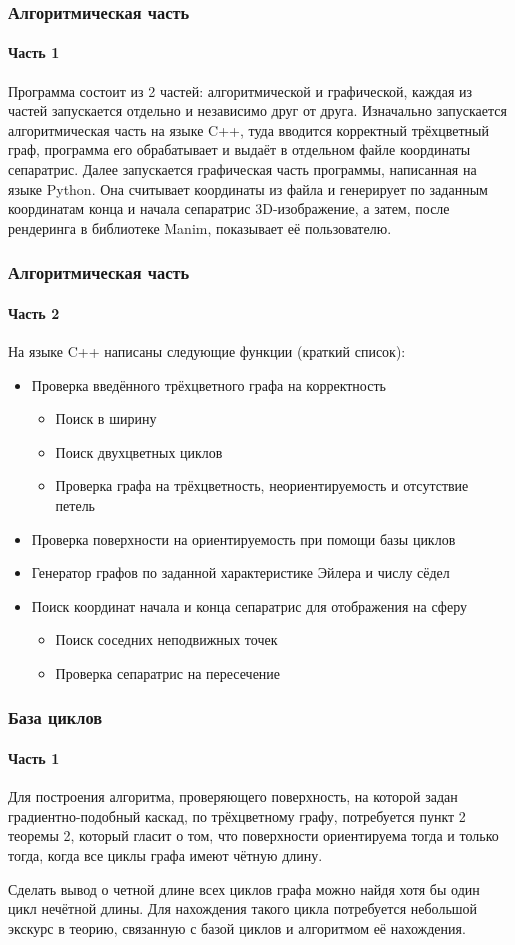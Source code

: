 \documentclass[aspectratio=169]{beamer}
\begin{document}
\begin{frame}
	\frametitle{Алгоритмическая часть}
	\framesubtitle{Часть 1}
	Программа состоит из 2 частей: алгоритмической и графической, каждая из частей запускается отдельно и независимо друг от друга. Изначально запускается алгоритмическая часть на языке C++, туда вводится корректный трёхцветный граф, программа его обрабатывает и выдаёт в отдельном файле координаты сепаратрис. Далее запускается графическая часть программы, написанная на языке Python. Она считывает координаты из файла и генерирует по заданным координатам конца и начала сепаратрис 3D-изображение, а затем, после рендеринга в библиотеке Manim, показывает её пользователю.
\end{frame}

\begin{frame}
	\frametitle{Алгоритмическая часть}
	\framesubtitle{Часть 2}
	На языке C++ написаны следующие функции (краткий список):
	\begin{itemize}
		\item Проверка введённого трёхцветного графа на корректность
		\begin{itemize}
			\item Поиск в ширину
			\item Поиск двухцветных циклов
			\item Проверка графа на трёхцветность, неориентируемость и отсутствие петель
		\end{itemize}
		\item Проверка поверхности на ориентируемость при помощи базы циклов
		\item Генератор графов по заданной характеристике Эйлера и числу
		сёдел
		\item Поиск координат начала и конца сепаратрис для отображения на сферу
		\begin{itemize}
			\item Поиск соседних неподвижных точек
			\item Проверка сепаратрис на пересечение
		\end{itemize}
	\end{itemize}
\end{frame}

\begin{frame}
	\frametitle{База циклов}
	\framesubtitle{Часть 1}
	Для построения алгоритма, проверяющего поверхность, на которой задан градиентно-подобный каскад, по трёхцветному графу, потребуется пункт 2 теоремы 2, который гласит о том, что поверхности ориентируема тогда и только тогда, когда все циклы графа имеют чётную длину.
	\par Сделать вывод о четной длине всех циклов графа можно найдя хотя бы один цикл нечётной длины. Для нахождения такого цикла потребуется небольшой экскурс в теорию, связанную с базой циклов и алгоритмом её нахождения.
\end{frame}
\end{document}
